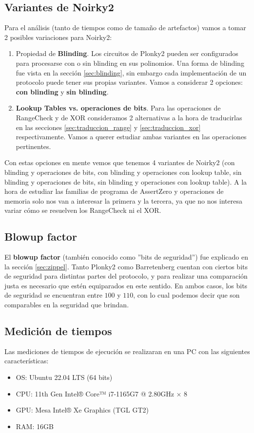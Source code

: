 \documentclass[11pt,a4paper]{tesis}
\begin{document}
\subsection{Variantes de Noirky2}
Para el análisis (tanto de tiempos como de tamaño de artefactos) vamos a tomar 2 posibles variaciones para Noirky2:
\begin{enumerate}
    \item Propiedad de \textbf{Blinding}. Los circuitos de Plonky2 pueden ser configurados para procesarse con o sin blinding en sus polinomios. Una forma de blinding fue vista en la sección \ref{sec:blinding}, sin embargo cada implementación de un protocolo puede tener sus propias variantes. Vamos a considerar 2 opciones: \textbf{con blinding} y \textbf{sin blinding}.
    \item \textbf{Lookup Tables vs. operaciones de bits}. Para las operaciones de RangeCheck y de XOR consideramos 2 alternativas a la hora de traducirlas en las secciones \ref{sec:traduccion_range} y \ref{sec:traduccion_xor} respectivamente. Vamos a querer estudiar ambas variantes en las operaciones pertinentes. 
\end{enumerate}

Con estas opciones en mente vemos que tenemos 4 variantes de Noirky2 (con blinding y operaciones de bits, con blinding y operaciones con lookup table, sin blinding y operaciones de bits, sin blinding y operaciones con lookup table). A la hora de estudiar las familias de programa de AssertZero y operaciones de memoria solo nos van a interesar la primera y la tercera, ya que no nos interesa variar cómo se resuelven los RangeCheck ni el XOR. 

\subsection{Blowup factor}
El \textbf{blowup factor} (también conocido como ''bits de seguridad'') fue explicado en la sección \ref{sec:zippel}. Tanto Plonky2 como Barretenberg cuentan con ciertos bits de seguridad para distintas partes del protocolo, y para realizar una comparación justa es necesario que estén equiparados en este sentido. En ambos casos, los bits de seguridad se encuentran entre $100$ y $110$, con lo cual podemos decir que son comparables en la seguridad que brindan.

\subsection{Medición de tiempos}
Las mediciones de tiempos de ejecución se realizaran en una PC con las siguientes características:
\begin{itemize}
    \item OS: Ubuntu 22.04 LTS (64 bits)
    \item CPU: 11th Gen Intel® Core™ i7-1165G7 @ 2.80GHz × 8
    \item GPU: Mesa Intel® Xe Graphics (TGL GT2)
    \item RAM: 16GB
\end{itemize}
\end{document}
